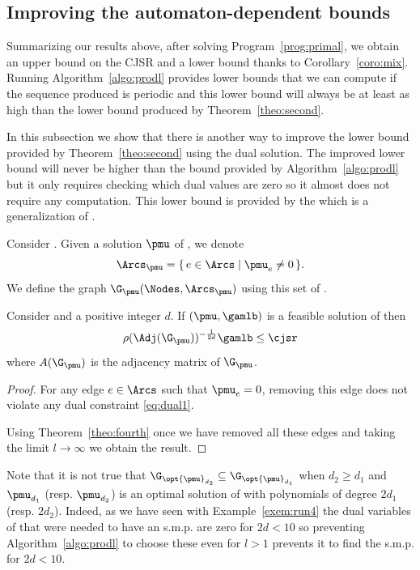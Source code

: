 \subsection{Improving the automaton-dependent bounds}
Summarizing our results above,
after solving Program~\ref{prog:primal}, we obtain an upper bound on
the CJSR and a lower bound thanks to Corollary~\ref{coro:mix}.
Running Algorithm~\ref{algo:prodl} provides lower bounds that we can
compute if the sequence produced is periodic and this lower bound will
always be at least as high than the lower bound produced by
Theorem~\ref{theo:second}.

In this subsection we show that there is another way to improve the lower
bound provided by Theorem~\ref{theo:second} using the dual solution.
The improved lower bound will never be higher than the bound provided by
Algorithm~\ref{algo:prodl} but it only requires checking which dual values are zero
so it almost does not require any computation.
This lower bound is provided by the  which is a
generalization of \cite[Theorem~3.10]{philippe2016stability}.


\begin{definition}
  Consider .
  Given a solution $\pmu$ of ,
  we denote
  \[ \Arcs_{\pmu} = \{\, e \in \Arcs \mid \pmu_e \neq 0 \,\}. \]
  We define the graph $\G_{\pmu}(\Nodes,\Arcs_{\pmu})$ using this set of \arcs{}.
\end{definition}

\begin{theorem}
  \label{theo:fifth}
  Consider  and a positive integer $d$.
  If $(\pmu, \gamlb)$ is a feasible solution of 
  then
  \[ \rho(\Adj(\G_{\pmu}))^{-\frac{1}{2d}} \gamlb \leq \cjsr \]
  where $A(\G_{\pmu})$ is the adjacency matrix of $\G_{\pmu}$.
  \begin{proof}
    For any edge $e \in \Arcs$ such that $\pmu_e = 0$, removing this
    edge does not violate any dual constraint \eqref{eq:dual1}.

    Using Theorem~\ref{theo:fourth} once we have removed all these
    edges and taking the limit $l \to \infty$ we obtain the result.
  \end{proof}
\end{theorem}

\begin{myrem}
  Note that it is not true that $\G_{\opt{\pmu}_{d_2}} \subseteq \G_{\opt{\pmu}_{d_1}}$ when
  $d_2 \geq d_1$ and $\pmu_{d_1}$ (resp. $\pmu_{d_2}$) is an optimal solution of 
  with polynomials of degree $2d_1$ (resp. $2d_2$).
  Indeed, as we have seen with Example~\ref{exem:run4} the dual
  variables of \arcs{} that were needed to have an s.m.p. are zero
  for $2d < 10$ so preventing Algorithm~\ref{algo:prodl} to choose
  these \arcs{} even for $l > 1$ prevents it to find the s.m.p. for
  $2d < 10$.
\end{myrem}
